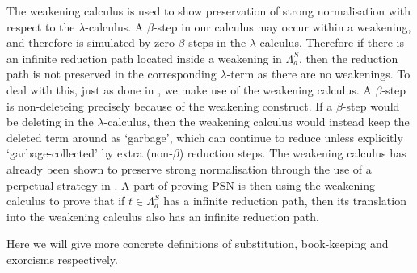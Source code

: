 \documentclass[a4paper,UKenglish,cleveref, autoref]{lipics-v2019}
\newcommand{\FALC}{\Lambda^{S}_{a}}
\begin{document}
The weakening calculus is used to show preservation of strong normalisation with respect to the $\lambda$-calculus. A $\beta$-step in our calculus may occur within a weakening, and therefore is simulated by zero $\beta$-steps in the $\lambda$-calculus. Therefore if there is an infinite reduction path located inside a weakening in $\FALC$, then the reduction path is not preserved in the corresponding $\lambda$-term as there are no weakenings. To deal with this, just as done in \cite{kesneraccattoli12, gundersen2013atomic, he2018atomic}, we make use of the weakening calculus. A $\beta$-step is non-deleteing precisely because of the weakening construct. If a $\beta$-step would be deleting in the $\lambda$-calculus, then the weakening calculus would instead keep the deleted term around as `garbage', which can continue to reduce unless explicitly `garbage-collected' by extra (non-$\beta$) reduction steps. The weakening calculus has already been shown to preserve strong normalisation through the use of a perpetual strategy in \cite{gundersen2013atomic}. A part of proving PSN is then using the weakening calculus to prove that if $t \in \FALC$ has a infinite reduction path, then its translation into the weakening calculus also has an infinite reduction path. 

Here we will give more concrete definitions of substitution, book-keeping and exorcisms respectively. 
\end{document}
